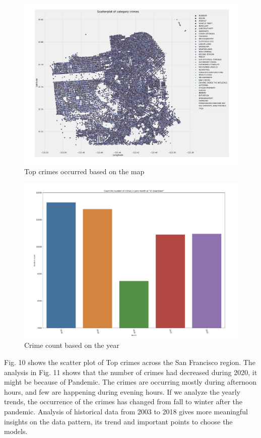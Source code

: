 \documentclass[conference,final, 10pt]{IEEEtran}
\begin{document}
\begin{figure}

{\centering \includegraphics[width=0.8\linewidth]{img/fig10} 

}

\caption{Top crimes occurred based on the map}\label{fig:unnamed-chunk-10}
\end{figure}

\begin{figure}

{\centering \includegraphics[width=0.8\linewidth]{img/fig11} 

}

\caption{Crime count based on the year}\label{fig:unnamed-chunk-11}
\end{figure}

Fig. 10 shows the scatter plot of Top crimes across the San Francisco
region. The analysis in Fig. 11 shows that the number of crimes had
decreased during 2020, it might be because of Pandemic. The crimes are
occurring mostly during afternoon hours, and few are happening during
evening hours. If we analyze the yearly trends, the occurrence of the
crimes has changed from fall to winter after the pandemic. Analysis of
historical data from 2003 to 2018 gives more meaningful insights on the
data pattern, its trend and important points to choose the models.
\end{document}
